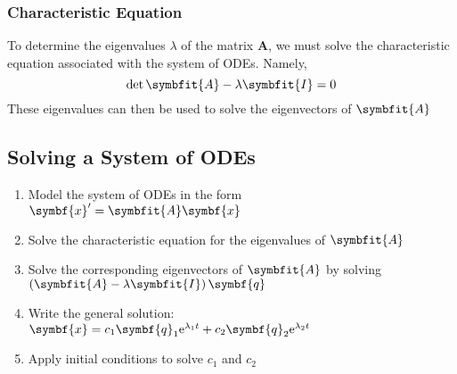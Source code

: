 \documentclass{article}
\begin{document}
\subsubsection{Characteristic Equation}
To determine the eigenvalues $\lambda$ of the matrix $\symbf{A}$, we must solve the characteristic equation
associated with the system of ODEs. Namely,
\begin{equation*}
    \det{\symbfit{A} - \lambda\symbfit{I}} = 0
\end{equation*}
These eigenvalues can then be used to solve the eigenvectors of $\symbfit{A}$
\subsection{Solving a System of ODEs}
\begin{enumerate}
    \item Model the system of ODEs in the form $\symbf{x}' = \symbfit{A} \symbf{x}$
    \item Solve the characteristic equation for the eigenvalues of $\symbfit{A}$
    \item Solve the corresponding eigenvectors of $\symbfit{A}$ by solving $\left( \symbfit{A} - \lambda\symbfit{I} \right) \symbf{q}$
    \item Write the general solution: $\symbf{x} = c_1\symbf{q}_1\e^{\lambda_1 t} + c_2\symbf{q}_2\e^{\lambda_2 t}$
    \item Apply initial conditions to solve $c_1$ and $c_2$
\end{enumerate}
\end{document}
